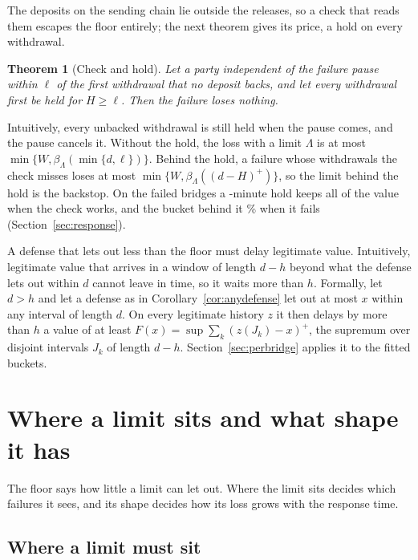 \documentclass[conference,compsoc]{IEEEtran}
\numberwithin{equation}{section}
\theoremstyle{plain}
\newtheorem{theorem}{Theorem}[section]
\theoremstyle{definition}
\theoremstyle{remark}
\begin{document}
The deposits on the sending chain lie outside the releases, so a check that reads them escapes the floor entirely; the next theorem gives its price, a hold on every withdrawal.

\begin{theorem}[Check and hold]\label{thm:gate}
Let a party independent of the failure pause within $\ell$ of the first withdrawal that no deposit backs, and let every withdrawal first be held for $H \ge \ell$. Then the failure loses nothing.
\end{theorem}

Intuitively, every unbacked withdrawal is still held when the pause comes, and the pause cancels it. Without the hold, the loss with a limit $\Lambda$ is at most $\min\{W, \beta_\Lambda(\min\{d, \ell\})\}$. Behind the hold, a failure whose withdrawals the check misses loses at most $\min\{W, \beta_\Lambda((d-H)^+)\}$, so the limit behind the hold is the backstop. On the failed bridges a \pbGateMin{}-minute hold keeps all of the value when the check works, and the bucket behind it \pbBucketPctR\% when it fails (Section~\ref{sec:response}).

A defense that lets out less than the floor must delay legitimate value. Intuitively, legitimate value that arrives in a window of length $d - h$ beyond what the defense lets out within $d$ cannot leave in time, so it waits more than $h$. Formally, let $d > h$ and let a defense as in Corollary~\ref{cor:anydefense} let out at most $x$ within any interval of length $d$. On every legitimate history $z$ it then delays by more than $h$ a value of at least $F(x) = \sup \sum_k (z(J_k) - x)^+$, the supremum over disjoint intervals $J_k$ of length $d - h$. Section~\ref{sec:perbridge} applies it to the fitted buckets.

\section{Where a limit sits and what shape it has}\label{sec:where}

The floor says how little a limit can let out. Where the limit sits decides which failures it sees, and its shape decides how its loss grows with the response time.

\subsection{Where a limit must sit}\label{sec:place}
\end{document}
